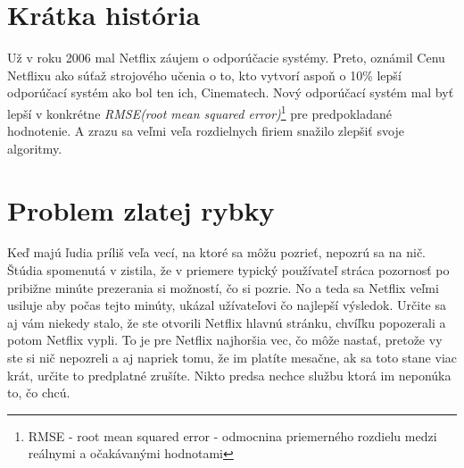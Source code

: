 \documentclass[10pt,twoside,slovak,a4paper]{article}
\begin{document}
\section{Krátka história} \label{Netflix cena} %
Už v roku 2006 mal Netflix záujem o odporúčacie systémy.\cite{amatriain2015recommender} Preto, oznámil Cenu Netflixu ako súťaž strojového učenia o to, kto vytvorí aspoň o 10\% lepší odporúčací systém ako bol ten ich, Cinematech. Nový odporúčací systém mal byť lepší v konkrétne \textit{RMSE(root mean squared error)}\footnote{RMSE - root mean squared error - odmocnina priemerného rozdielu medzi reálnymi a očakávanými hodnotami\cite{EncyclopaediaBritannica}} pre predpokladané hodnotenie. A zrazu sa veľmi veľa rozdielnych firiem snažilo zlepšiť svoje algoritmy.

\section{Problem zlatej rybky} \label{Krátka pozornosť}
Keď majú ľudia príliš veľa vecí, na ktoré sa môžu pozrieť, nepozrú sa na nič. Štúdia spomenutá v \cite{10.1145/2843948} zistila, že v priemere typický používateľ stráca pozornosť po pribižne minúte prezerania si možností, čo si pozrie. No a teda sa Netflix veľmi usiluje aby počas tejto minúty, ukázal užívateľovi čo najlepší výsledok. Určite sa aj vám niekedy stalo, že ste otvorili Netflix hlavnú stránku, chvíľku popozerali a potom Netflix vypli. To je pre Netflix najhoršia vec, čo môže nastať, pretože vy ste si nič nepozreli a aj napriek tomu, že im platíte mesačne, ak sa toto stane viac krát, určite to predplatné zrušíte. Nikto predsa nechce službu ktorá im neponúka to, čo chcú.
\end{document}
